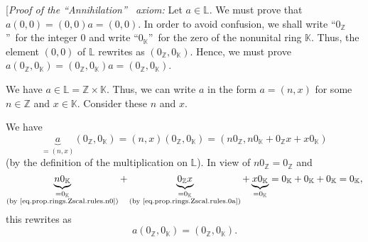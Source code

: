 \documentclass[paper=a4, fontsize=12pt]{scrartcl}%
\theoremstyle{plainsl}
\theoremstyle{definition}
\theoremstyle{remark}
\begin{document}
[\textit{Proof of the \textquotedblleft Annihilation\textquotedblright%
\ axiom:} Let $a\in\mathbb{L}$. We must prove that $a\left(  0,0\right)
=\left(  0,0\right)  a=\left(  0,0\right)  $. In order to avoid confusion, we
shall write \textquotedblleft$0_{\mathbb{Z}}$\textquotedblright\ for the
integer $0$ and write \textquotedblleft$0_{\mathbb{K}}$\textquotedblright\ for
the zero of the nonunital ring $\mathbb{K}$. Thus, the element $\left(
0,0\right)  $ of $\mathbb{L}$ rewrites as $\left(  0_{\mathbb{Z}%
},0_{\mathbb{K}}\right)  $. Hence, we must prove $a\left(  0_{\mathbb{Z}%
},0_{\mathbb{K}}\right)  =\left(  0_{\mathbb{Z}},0_{\mathbb{K}}\right)
a=\left(  0_{\mathbb{Z}},0_{\mathbb{K}}\right)  $.

We have $a\in\mathbb{L}=\mathbb{Z}\times\mathbb{K}$. Thus, we can write $a$ in
the form $a=\left(  n,x\right)  $ for some $n\in\mathbb{Z}$ and $x\in
\mathbb{K}$. Consider these $n$ and $x$.

We have
\[
\underbrace{a}_{=\left(  n,x\right)  }\left(  0_{\mathbb{Z}},0_{\mathbb{K}%
}\right)  =\left(  n,x\right)  \left(  0_{\mathbb{Z}},0_{\mathbb{K}}\right)
=\left(  n0_{\mathbb{Z}},n0_{\mathbb{K}}+0_{\mathbb{Z}}x+x0_{\mathbb{K}%
}\right)
\]
(by the definition of the multiplication on $\mathbb{L}$). In view of
$n0_{\mathbb{Z}}=0_{\mathbb{Z}}$ and
\[
\underbrace{n0_{\mathbb{K}}}_{\substack{=0_{\mathbb{K}}\\\text{(by
\eqref{eq.prop.rings.Zscal.rules.n0})}}}+\underbrace{0_{\mathbb{Z}}%
x}_{\substack{=0_{\mathbb{K}}\\\text{(by
\eqref{eq.prop.rings.Zscal.rules.0a})}}}+\underbrace{x0_{\mathbb{K}}%
}_{=0_{\mathbb{K}}}=0_{\mathbb{K}}+0_{\mathbb{K}}+0_{\mathbb{K}}%
=0_{\mathbb{K}},
\]
this rewrites as
\[
a\left(  0_{\mathbb{Z}},0_{\mathbb{K}}\right)  =\left(  0_{\mathbb{Z}%
},0_{\mathbb{K}}\right)  .
\]
\end{document}
